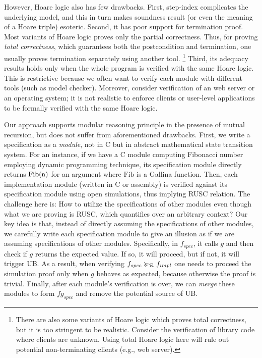 However, Hoare logic also has few drawbacks.
First, step-index complicates the underlying model, and this in turn makes soundness result (or even the meaning of a Hoare triple) esoteric.
Second, it has poor support for termination proof.
Most variants of Hoare logic proves only the partial correctness.
Thus, for proving {\it total correctness}, which guarantees both the postcondition and termination, one usually proves termination separately using another tool.
\footnote{There are also some variants of Hoare logic which proves total correctness, but it is too stringent to be realistic. Consider the verification of library code where clients are unknown.
Using total Hoare logic here will rule out potential non-terminating clients (e.g., web server).}
Third, its adequacy results holds only when the whole program is verified with the same Hoare logic. This is restrictive because we often want to verify each module with different tools (such as model checker).
Moreover, consider verification of an web server or an operating system; it is not realistic to enforce clients or user-level applications to be formally verified with the same Hoare logic.








Our approach supports modular reasoning principle in the presence of mutual recursion, but does not suffer from aforementioned drawbacks.
First, we write a specification as a {\it module}, not in C but in abstract mathematical state transition system. %
For an instance, if we have a C module computing Fibonacci number employing dynamic programming technique, its specification module directly returns $\mathrm{Fib}(\texttt{n})$ for an argument  where $\mathrm{Fib}$ is a Gallina function.
Then, each implementation module (written in C or assembly) is verified against its specification module using open simulations, thus implying RUSC relation.
The challenge here is: How to utilize the specifications of other modules even though what we are proving is RUSC, which quantifies over an arbitrary context?
Our key idea is that, instead of directly assuming the specifications of other modules, we carefully write each specification module to give an illusion as if we are assuming specifications of other modules.
Specifically, in $f_{spec}$, it calls $g$ and then check if $g$ returns the expected value. If so, it will proceed, but if not, it will trigger UB.
As a result, when verifying $f_{spec} \succcurlyeq_{\mathcal{R}} f_{impl}$ one needs to proceed the simulation proof only when $g$ behaves as expected, because otherwise the proof is trivial.
Finally, after each module's verification is over, we can {\it merge} these modules to form $fg_{spec}$ and remove the potential source of UB.

